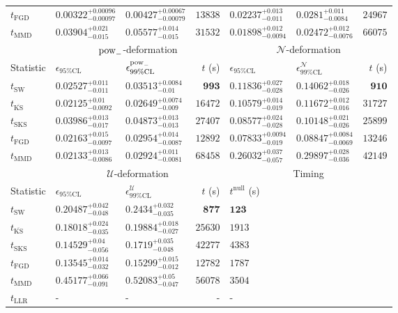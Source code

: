 \begin{tabular}{l|llr|llr}
	$t_{\mathrm{FGD}}$ & ${\mathbf{0.00322_{-0.00097}^{+0.00096}}}$ & ${\mathbf{0.00427_{-0.00079}^{+0.00067}}}$ & $13838$ & $0.02237_{-0.011}^{+0.013}$ & $0.0281_{-0.0084}^{+0.011}$ & $24967$ \\
	$t_{\mathrm{MMD}}$ & $0.03904_{-0.015}^{+0.021}$ & $0.05577_{-0.015}^{+0.014}$ & $31532$ & ${\mathbf{0.01898_{-0.0094}^{+0.012}}}$ & ${\mathbf{0.02472_{-0.0076}^{+0.012}}}$ & $66075$ \\
	\toprule
	\multicolumn{1}{c}{} & \multicolumn{3}{c}{$\rm{pow}_{-}$-deformation} & \multicolumn{3}{c}{$\mathcal{N}$-deformation} \\
	Statistic & $\epsilon_{95\%\mathrm{CL}}$ & $\epsilon^  {\rm{pow}_{-}}_{99\%\mathrm{CL}}$ & $t$ (s) & $\epsilon_{95\%\mathrm{CL}}$ & $\epsilon^    {\mathcal{N}}_{99\%\mathrm{CL}}$ & $t$ (s) \\
	\midrule
	$t_{\mathrm{SW}}$ & $0.02527_{-0.011}^{+0.011}$ & $0.03513_{-0.01}^{+0.0084}$ & ${\mathbf{993}}$ & $0.11836_{-0.028}^{+0.027}$ & $0.14062_{-0.026}^{+0.018}$ & ${\mathbf{910}}$ \\
	$t_{\overline{\mathrm{KS}}}$ & ${\mathbf{0.02125_{-0.0092}^{+0.01}}}$ & ${\mathbf{0.02649_{-0.009}^{+0.0074}}}$ & $16472$ & $0.10579_{-0.019}^{+0.014}$ & $0.11672_{-0.016}^{+0.012}$ & $31727$ \\
	$t_{\mathrm{SKS}}$ & $0.03986_{-0.017}^{+0.013}$ & $0.04873_{-0.013}^{+0.013}$ & $27407$ & $0.08577_{-0.028}^{+0.024}$ & $0.10148_{-0.026}^{+0.021}$ & $25899$ \\
	$t_{\mathrm{FGD}}$ & $0.02163_{-0.0097}^{+0.015}$ & $0.02954_{-0.0087}^{+0.014}$ & $12892$ & ${\mathbf{0.07833_{-0.019}^{+0.0094}}}$ & ${\mathbf{0.08847_{-0.0069}^{+0.0084}}}$ & $13246$ \\
	$t_{\mathrm{MMD}}$ & $0.02133_{-0.0086}^{+0.013}$ & $0.02924_{-0.0081}^{+0.011}$ & $68458$ & $0.26032_{-0.057}^{+0.037}$ & $0.29897_{-0.036}^{+0.028}$ & $42149$ \\
	\toprule
	\multicolumn{1}{c}{} & \multicolumn{3}{c}{$\mathcal{U}$-deformation} & \multicolumn{3}{c}{Timing} \\
	Statistic & $\epsilon_{95\%\mathrm{CL}}$ & $\epsilon^    {\mathcal{U}}_{99\%\mathrm{CL}}$ & $t$ (s) & $t^{\mathrm{null}}$ (s) \\
	\midrule
	$t_{\mathrm{SW}}$ & $0.20487_{-0.048}^{+0.042}$ & $0.2434_{-0.035}^{+0.032}$ & ${\mathbf{877}}$ & ${\mathbf{123}}$ \\
	$t_{\overline{\mathrm{KS}}}$ & $0.18018_{-0.035}^{+0.024}$ & $0.19884_{-0.027}^{+0.018}$ & $25630$ & $1913$ \\
	$t_{\mathrm{SKS}}$ & $0.14529_{-0.056}^{+0.04}$ & $0.1719_{-0.048}^{+0.035}$ & $42277$ & $4383$ \\
	$t_{\mathrm{FGD}}$ & ${\mathbf{0.13545_{-0.032}^{+0.014}}}$ & ${\mathbf{0.15299_{-0.012}^{+0.015}}}$ & $12782$ & $1787$ \\
	$t_{\mathrm{MMD}}$ & $0.45177_{-0.091}^{+0.066}$ & $0.52083_{-0.047}^{+0.05}$ & $56078$ & $3504$ \\
	$t_{\mathrm{LLR}}$ & - & - & - & - \\
	\bottomrule
\end{tabular}